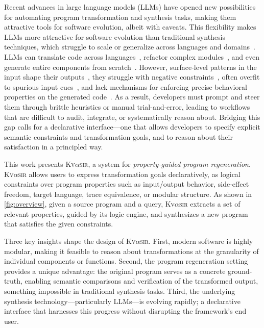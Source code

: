 \documentclass[nonacm,sigplan,review]{acmart}
\newcommand{\sys}{{\scshape Kv{$\alpha$}sir}\xspace}
\begin{document}
Recent advances in large language models (LLMs) have opened new possibilities for automating program transformation and synthesis tasks, making them attractive tools for software evolution, albeit with caveats.
This flexibility makes LLMs more attractive for software evolution than traditional synthesis techniques, which struggle to scale or generalize
across languages and domains~\cite{reynolds2019syguscomp,leino2016dafny,wu2023programming,dynamoth2016,cambronero2019active}.
LLMs can translate code across languages~\cite{ou2025enhancingllmbasedcodetranslation},
refactor complex modules~\cite{ziftci2025migrating},
and even generate entire components from scratch~\cite{huynh2025largelanguagemodelscode}.
However, surface-level patterns in the input shape their outputs~\cite{yang2025evaluatinggeneralizationcapabilitieslarge},
they struggle with negative constraints~\cite{hwang2024thinkpinkelephant,jiang2024llmsdreamelephantswhen},
often overfit to spurious input cues~\cite{xu2023llmfoolitselfpromptbased, wu2023deceptpromptexploitingllmdrivencode},
and lack mechanisms for enforcing precise behavioral properties on the generated code~\cite{roh2025breakthechainreasoningfailuresllms}.
As a result, developers must prompt and steer them through brittle heuristics or manual trial-and-error, leading to workflows that are difficult to audit, integrate, or systematically reason about.
Bridging this gap calls for a declarative interface---one that allows developers to specify explicit semantic constraints and transformation goals, and to reason about their satisfaction in a principled way.

This work presents \sys, a system for \emph{property-guided program regeneration}.
\sys allows users
to express transformation goals declaratively, as logical constraints over
program properties such as input/output behavior, side-effect freedom, target
language, trace equivalence, or modular structure.
As shown in \cref{fig:overview}, given a source program and
a query, \sys extracts a set of relevant properties, guided by its
logic engine, and synthesizes a new
program that satisfies the given constraints.

Three key insights shape the design of \sys.
First, modern software is highly modular, making it feasible to reason about transformations at the granularity of individual components or functions.
Second, the program regeneration setting provides a unique advantage: the original program serves as a concrete ground-truth, enabling semantic comparisons and verification of the transformed output, something impossible in traditional synthesis tasks.
Third, the underlying synthesis technology---particularly LLMs---is evolving rapidly; a declarative interface that harnesses this progress without disrupting the framework's end user.
\end{document}
